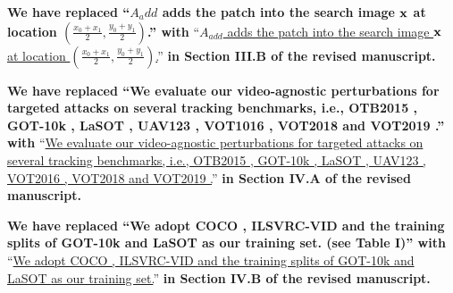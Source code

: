 \documentclass[12pt]{article}
\begin{document}
\textbf{We have  replaced ``$A_add$ adds the patch into the search image $\textbf x$ at location $(\frac{x_0+x_1}{2},\frac{y_0+y_1}{2})$.'' with}
``\uline{$A_{add}$ adds the patch into the search image $\textbf x$ at location $(\frac{x_0+x_1}{2},\frac{y_0+y_1}{2})$.}''
\textbf{in Section III.B of the revised manuscript.}

\textbf{We have replaced ``We evaluate our video-agnostic perturbations for targeted attacks on several tracking benchmarks, i.e., OTB2015 \cite{OTB}, GOT-10k \cite{GOT-10k}, LaSOT \cite{LaSOT}, UAV123 \cite{UAV123}, VOT1016 \cite{VOT2016}, VOT2018 \cite{VOT2018} and VOT2019 \cite{VOT2019}.'' with}
``\uline{We evaluate our video-agnostic perturbations for targeted attacks on several tracking benchmarks, i.e., OTB2015 \cite{OTB}, GOT-10k \cite{GOT-10k}, LaSOT \cite{LaSOT}, UAV123 \cite{UAV123}, VOT2016 \cite{VOT2016}, VOT2018 \cite{VOT2018} and VOT2019 \cite{VOT2019}.}''
\textbf{in Section IV.A of the revised manuscript.}

\textbf{We have replaced ``We adopt COCO \cite{COCO}, ILSVRC-VID \cite{VID} and the training splits of GOT-10k \cite{GOT-10k} and LaSOT \cite{LaSOT} as our training set. (see Table I)'' with}
``\uline{We adopt COCO \cite{COCO}, ILSVRC-VID \cite{VID} and the training splits of GOT-10k \cite{GOT-10k} and LaSOT \cite{LaSOT} as our training set.}''
\textbf{in Section IV.B of the revised manuscript.}

\normalem


\end{document}

